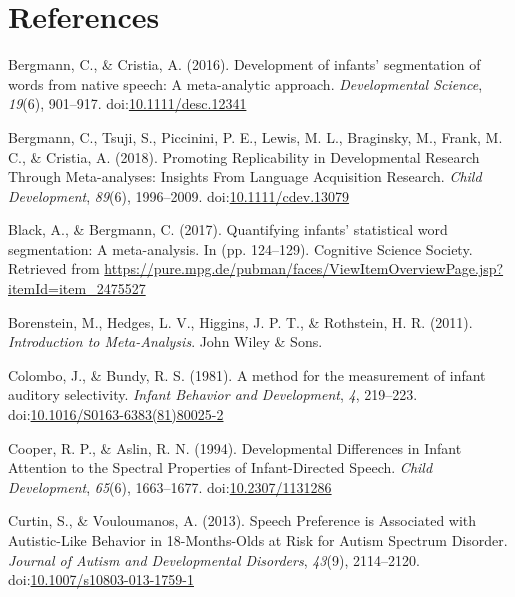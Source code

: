 \documentclass[man]{apa6}
\begin{document}
\newpage

\section{References}\label{references}

\begingroup
\setlength{\parindent}{-0.5in} \setlength{\leftskip}{0.5in}

\hypertarget{refs}{}
\hypertarget{ref-bergmann_development_2016}{}
Bergmann, C., \& Cristia, A. (2016). Development of infants'
segmentation of words from native speech: A meta-analytic approach.
\emph{Developmental Science}, \emph{19}(6), 901--917.
doi:\href{https://doi.org/10.1111/desc.12341}{10.1111/desc.12341}

\hypertarget{ref-bergmann_promoting_2018}{}
Bergmann, C., Tsuji, S., Piccinini, P. E., Lewis, M. L., Braginsky, M.,
Frank, M. C., \& Cristia, A. (2018). Promoting Replicability in
Developmental Research Through Meta-analyses: Insights From Language
Acquisition Research. \emph{Child Development}, \emph{89}(6),
1996--2009.
doi:\href{https://doi.org/10.1111/cdev.13079}{10.1111/cdev.13079}

\hypertarget{ref-black_quantifying_2017}{}
Black, A., \& Bergmann, C. (2017). Quantifying infants' statistical word
segmentation: A meta-analysis. In (pp. 124--129). Cognitive Science
Society. Retrieved from
\url{https://pure.mpg.de/pubman/faces/ViewItemOverviewPage.jsp?itemId=item_2475527}

\hypertarget{ref-borenstein_introduction_2011}{}
Borenstein, M., Hedges, L. V., Higgins, J. P. T., \& Rothstein, H. R.
(2011). \emph{Introduction to Meta-Analysis}. John Wiley \& Sons.

\hypertarget{ref-colombo_method_1981}{}
Colombo, J., \& Bundy, R. S. (1981). A method for the measurement of
infant auditory selectivity. \emph{Infant Behavior and Development},
\emph{4}, 219--223.
doi:\href{https://doi.org/10.1016/S0163-6383(81)80025-2}{10.1016/S0163-6383(81)80025-2}

\hypertarget{ref-cooper_developmental_1994}{}
Cooper, R. P., \& Aslin, R. N. (1994). Developmental Differences in
Infant Attention to the Spectral Properties of Infant-Directed Speech.
\emph{Child Development}, \emph{65}(6), 1663--1677.
doi:\href{https://doi.org/10.2307/1131286}{10.2307/1131286}

\hypertarget{ref-curtin_speech_2013}{}
Curtin, S., \& Vouloumanos, A. (2013). Speech Preference is Associated
with Autistic-Like Behavior in 18-Months-Olds at Risk for Autism
Spectrum Disorder. \emph{Journal of Autism and Developmental Disorders},
\emph{43}(9), 2114--2120.
doi:\href{https://doi.org/10.1007/s10803-013-1759-1}{10.1007/s10803-013-1759-1}
\end{document}
